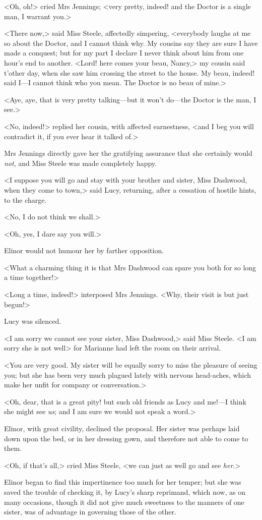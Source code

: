 <Oh, oh!> cried Mrs Jennings; <very pretty, indeed! and the Doctor is a single man, I warrant you.>

<There now,> said Miss Steele, affectedly simpering, <everybody laughs at me so about the Doctor, and I cannot think why. My cousins say they are sure I have made a conquest; but for my part I declare I never think about him from one hour's end to another. <Lord! here comes your beau, Nancy,> my cousin said t'other day, when she saw him crossing the street to the house. My beau, indeed! said I—I cannot think who you mean. The Doctor is no beau of mine.>

<Aye, aye, that is very pretty talking—but it won't do—the Doctor is the man, I see.>

<No, indeed!> replied her cousin, with affected earnestness, <and I beg you will contradict it, if you ever hear it talked of.>

Mrs Jennings directly gave her the gratifying assurance that she certainly would \textit{not}, and Miss Steele was made completely happy.

<I suppose you will go and stay with your brother and sister, Miss Dashwood, when they come to town,> said Lucy, returning, after a cessation of hostile hints, to the charge.

<No, I do not think we shall.>

<Oh, yes, I dare say you will.>

Elinor would not humour her by farther opposition.

<What a charming thing it is that Mrs Dashwood can spare you both for so long a time together!>

<Long a time, indeed!> interposed Mrs Jennings. <Why, their visit is but just begun!>

Lucy was silenced.

<I am sorry we cannot see your sister, Miss Dashwood,> said Miss Steele. <I am sorry she is not well\longdash> for Marianne had left the room on their arrival.

<You are very good. My sister will be equally sorry to miss the pleasure of seeing you; but she has been very much plagued lately with nervous head-aches, which make her unfit for company or conversation.>

<Oh, dear, that is a great pity! but such old friends as Lucy and me!—I think she might see \textit{us}; and I am sure we would not speak a word.>

Elinor, with great civility, declined the proposal. Her sister was perhaps laid down upon the bed, or in her dressing gown, and therefore not able to come to them.

<Oh, if that's all,> cried Miss Steele, <we can just as well go and see \textit{her}.>

Elinor began to find this impertinence too much for her temper; but she was saved the trouble of checking it, by Lucy's sharp reprimand, which now, as on many occasions, though it did not give much sweetness to the manners of one sister, was of advantage in governing those of the other.